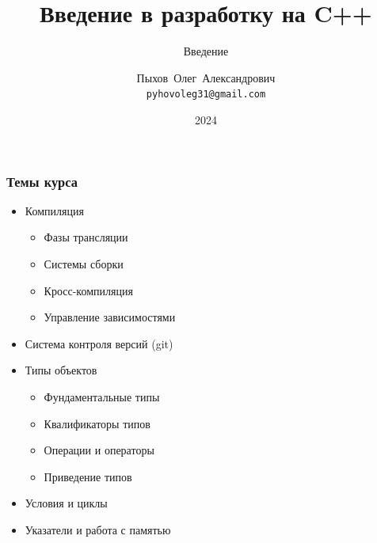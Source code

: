 \documentclass[compress]{beamer}
\title{Введение в разработку на C++}
\subtitle{Введение}
\author{Пыхов~Олег~Александрович\inst{1} \\ \texttt{pyhovoleg31@gmail.com}}
\institute{
    \inst{1}%
    ООО~"Прософт-Системы"
}
\date{2024}
\begin{document}
\frame[plain]{\titlepage}

\begin{frame}

    \frametitle{Темы курса}

    \begin{itemize}

        \item Компиляция

            \begin{itemize}

                \item Фазы трансляции

                \item Системы сборки

                \item Кросс-компиляция

                \item Управление зависимостями

            \end{itemize}

        \item Система контроля версий (git)

        \item Типы объектов

            \begin{itemize}

                \item Фундаментальные типы

                \item Квалификаторы типов

                \item Операции и операторы

                \item Приведение типов

            \end{itemize}

        \item Условия и циклы

        \item Указатели и работа с памятью

    \end{itemize}

\end{frame}
\end{document}
